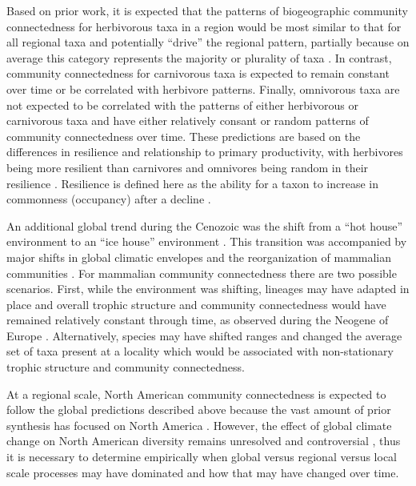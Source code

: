 \documentclass[12pt,letterpaper]{article}
\begin{document}
Based on prior work, it is expected that the patterns of biogeographic community connectedness for herbivorous taxa in a region would be most similar to that for all regional taxa and potentially ``drive'' the regional pattern, partially because on average this category represents the majority or plurality of taxa \citep{Jernvall2002}. In contrast, community connectedness for carnivorous taxa is expected to remain constant over time or be correlated with herbivore patterns. Finally, omnivorous taxa are not expected to be correlated with the patterns of either herbivorous or carnivorous taxa and have either relatively consant or random patterns of community connectedness over time.  These predictions are based on the differences in resilience and relationship to primary productivity, with herbivores being more resilient than carnivores and omnivores being random in their resilience \citep{Jernvall2004}. Resilience is defined here as the ability for a taxon to increase in commonness (occupancy) after a decline \citep{Jernvall2004}.

An additional global trend during the Cenozoic was the shift from a ``hot house'' environment to an ``ice house'' environment \citep{Zachos2008,Zachos2001}. This transition was accompanied by major shifts in global climatic envelopes and the reorganization of mammalian communities \citep{Janis1993a,Fortelius2002,Blois2009,Alroy2000g,Figueirido2012}. For mammalian community connectedness there are two possible scenarios. First, while the environment was shifting, lineages may have adapted in place and overall trophic structure and community connectedness would have remained relatively constant through time, as observed during the Neogene of Europe \citep{Jernvall2004}. Alternatively, species may have shifted ranges and changed the average set of taxa present at a locality which would be associated with non-stationary trophic structure and community connectedness.

At a regional scale, North American community connectedness is expected to follow the global predictions described above because the vast amount of prior synthesis has focused on North America \citep{Alroy2000g,Alroy1996a,Alroy1998,Barnosky2001a,Simpson1944,Simpson1953,Badgley2013,Blois2009,Figueirido2012,Gunnell1995,Hadly2001}. However, the effect of global climate change on North American diversity remains unresolved and controversial \citep{Alroy2000g,Blois2009,Figueirido2012,Barnosky2001a}, thus it is necessary to determine empirically when global versus regional versus local scale processes may have dominated and how that may have changed over time.
\end{document}
